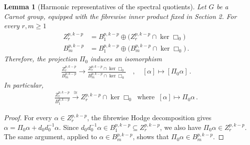 \documentclass[dvipsnames]{amsart}
\newtheorem{lemma}[theorem]{Lemma}
\theoremstyle{definition}
\theoremstyle{definition}
\numberwithin{equation}{section}
\begin{document}
\begin{lemma}[Harmonic representatives of the spectral quotients]\label{lem: Harmonic reduction of the spectral quotients}
    Let $G$ be a Carnot group, equipped with the fibrewise inner product fixed in Section 2. For every $r,m \geq 1$
    \begin{align*}
        Z_r^{p,k-p} &= B_1^{p,k-p} \oplus \big( Z_r^{p,k-p} \cap \ker \Box_0 \big)\\
        B_m^{p,k-p} &= B_1^{p,k-p} \oplus \big( B_m^{p,k-p} \cap \ker \Box_0 \big)\,.
    \end{align*}
    Therefore, the projection $\Pi_0$ induces an isomorphism 
    \begin{align*}
\frac{Z_r^{p,k-p}}{B_m^{p,k-p}}
\longrightarrow
\frac{Z_r^{p,k-p}\cap \ker \Box_0}{B_m^{p,k-p}\cap \ker \Box_0} \quad ,\quad 
[\alpha]
\mapsto
[\Pi_0\alpha]\,.
\end{align*}
In particular,
\begin{align*}
\frac{Z_r^{p,k-p}}{B_1^{p,k-p}}
\xrightarrow[]{\cong}
Z_r^{p,k-p} \cap \ker \Box_0\ \text{ where }\ [\alpha]\mapsto\Pi_0\alpha \,.
\end{align*}
\end{lemma}
\begin{proof}
For every $\alpha\in Z_r^{p,k-p}$, the fibrewise Hodge decomposition gives $
\alpha=\Pi_0\alpha+d_0d_0^{-1}\alpha$. Since $d_0d_0^{-1}\alpha\in B_1^{p,k-p}\subseteq Z_r^{p,k-p}$, we also have $\Pi_0\alpha\in Z_r^{p,k-p}$. The same argument, applied to $\alpha\in B_m^{p,k-p}$, shows that $\Pi_0\alpha\in B_m^{p,k-p}$.
\end{proof}
\end{document}
